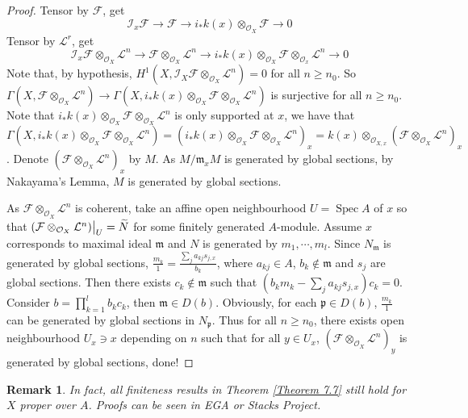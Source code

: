 \documentclass{ctexart}
\newtheorem{remark}{Remark}[section]
\newcommand{\spec}{\operatorname{Spec}}
\begin{document}
\begin{proof}
    Tensor by $\mathcal{F}$, get
    \begin{equation*}
        \mathcal{I}_{x}\mathcal{F} \longrightarrow \mathcal{F} \longrightarrow i_{\ast}k(x) \otimes_{\mathcal{O}_{X}} \mathcal{F} \longrightarrow 0
    \end{equation*}
    Tensor by $\mathcal{L}^{r}$, get
    \begin{equation*}
        \mathcal{I}_{x}\mathcal{F} \otimes_{\mathcal{O}_{X}} \mathcal{L}^{n} \longrightarrow \mathcal{F} \otimes_{\mathcal{O}_{X}} \mathcal{L}^{n} \longrightarrow i_{\ast}k(x) \otimes_{\mathcal{O}_{X}} \mathcal{F} \otimes_{\mathcal{O}_{x}} \mathcal{L}^{n}\longrightarrow 0
    \end{equation*}
    Note that, by hypothesis, $H^{1}(X, \mathcal{I}_{X}\mathcal{F} \otimes_{\mathcal{O}_{X}} \mathcal{L}^{n}) = 0$ for all $n \ge n_{0}$.
    So $\Gamma(X, \mathcal{F} \otimes_{\mathcal{O}_{X}} \mathcal{L}^{n}) \longrightarrow \Gamma(X, i_{\ast}k(x) \otimes_{\mathcal{O}_{X}} \mathcal{F} \otimes_{\mathcal{O}_{X}} \mathcal{L}^{n})$ is surjective for all $n \ge n_{0}$.
    Note that $i_{\ast}k(x) \otimes_{\mathcal{O}_{X}} \mathcal{F} \otimes_{\mathcal{O}_{X}} \mathcal{L}^{n}$ is only supported at $x$,
    we have that $\Gamma(X, i_{\ast}k(x) \otimes_{\mathcal{O}_{X}} \mathcal{F} \otimes_{\mathcal{O}_{X}} \mathcal{L}^{n}) = (i_{\ast}k(x) \otimes_{\mathcal{O}_{X}} \mathcal{F} \otimes_{\mathcal{O}_{X}} \mathcal{L}^{n})_{x} = k(x) \otimes_{\mathcal{O}_{X, x}} (\mathcal{F} \otimes_{\mathcal{O}_{X}} \mathcal{L}^{n})_{x}$.
    Denote $(\mathcal{F} \otimes_{\mathcal{O}_{X}} \mathcal{L}^{n})_{x}$ by $M$.
    As $M/\mathfrak{m}_{x}M$ is generated by global sections, by Nakayama's Lemma, $M$ is generated by global sections.
    \par
    As $\mathcal{F} \otimes_{\mathcal{O}_{X}} \mathcal{L}^{n}$ is coherent,
    take an affine open neighbourhood $U = \spec A$ of $x$ so that $(\mathcal{F} \otimes_{\mathcal{O}_{X}} \mathcal{L}^{n})\big{|}_{U} = \widetilde{N}$ for some finitely generated $A$-module.
    Assume $x$ corresponds to maximal ideal $\mathfrak{m}$ and $N$ is generated by $m_{1}, \cdots, m_{l}$.
    Since $N_{\mathfrak{m}}$ is generated by global sections, $\frac{m_{k}}{1} = \frac{\sum_{j} a_{kj}s_{j, x}}{b_{k}}$,
    where $a_{kj}\in A$, $b_{k}\notin \mathfrak{m}$ and $s_{j}$ are global sections.
    Then there exists $c_{k}\notin \mathfrak{m}$ such that $(b_{k}m_{k} - \sum_{j} a_{kj}s_{j, x})c_{k} = 0$.
    Consider $b = \prod_{k = 1}^{l} b_{k}c_{k}$, then $\mathfrak{m}\in D(b)$.
    Obviously, for each $\mathfrak{p}\in D(b)$, $\frac{m_{k}}{1}$ can be generated by global sections in $N_{\mathfrak{p}}$.
    Thus for all $n \ge n_{0}$, there exists open neighbourhood $U_{x}\ni x$ depending on $n$ such that for all $y\in U_{x}$,
    $(\mathcal{F} \otimes_{\mathcal{O}_{X}} \mathcal{L}^{n})_{y}$ is generated by global sections, done!
\end{proof}
\begin{remark}
    In fact, all finiteness results in Theorem \ref{Theorem 7.7} still hold for $X$ proper over $A$.
    Proofs can be seen in EGA or Stacks Project.
\end{remark}
\end{document}
